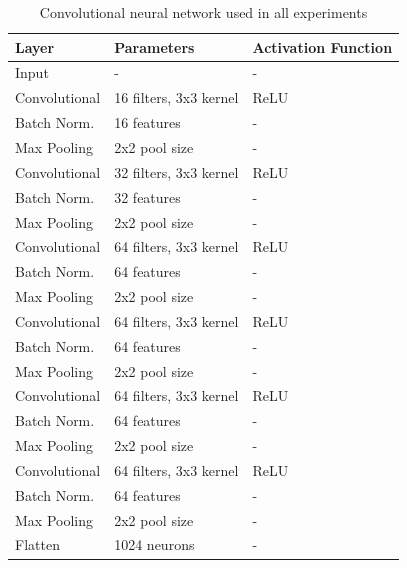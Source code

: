 \documentclass{article}
\begin{document}
\begin{table}[h]
  \centering
  \begin{tabular}{l|l|l}
    \textbf{Layer} & \textbf{Parameters} & \textbf{Activation Function} \\ \hline
    Input & - & - \\
    Convolutional & 16 filters, 3x3 kernel & ReLU \\
    Batch Norm. & 16 features & - \\
    Max Pooling & 2x2 pool size & - \\
    Convolutional & 32 filters, 3x3 kernel & ReLU \\
    Batch Norm. & 32 features & - \\
    Max Pooling & 2x2 pool size & - \\
    Convolutional & 64 filters, 3x3 kernel & ReLU \\
    Batch Norm. & 64 features & - \\
    Max Pooling & 2x2 pool size & - \\
    Convolutional & 64 filters, 3x3 kernel & ReLU \\
    Batch Norm. & 64 features & - \\
    Max Pooling & 2x2 pool size & - \\
    Convolutional & 64 filters, 3x3 kernel & ReLU \\
    Batch Norm. & 64 features & - \\
    Max Pooling & 2x2 pool size & - \\
    Convolutional & 64 filters, 3x3 kernel & ReLU \\
    Batch Norm. & 64 features & - \\
    Max Pooling & 2x2 pool size & - \\
    Flatten & 1024 neurons & - \\
  \end{tabular}
  \caption{Convolutional neural network used in all experiments}
  \label{tab:CNN}
\end{table}



\end{document}
